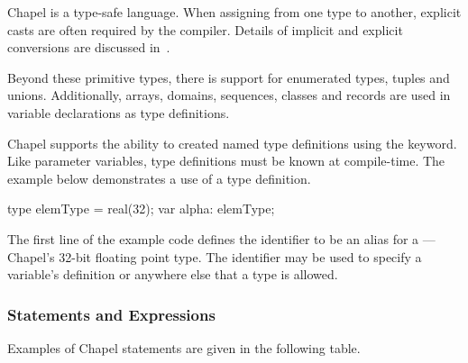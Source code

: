 Chapel is a type-safe language.  When assigning from one type to another, explicit 
casts are often required by the compiler.  Details of implicit and explicit
conversions are discussed in~.


Beyond these primitive types, there is support for enumerated types, tuples and
unions.  Additionally, arrays, domains, sequences, classes and records are
used in variable declarations as type definitions.

Chapel supports the ability to created named type definitions using
the  keyword.  Like parameter variables, type definitions
must be known at compile-time.  The example below demonstrates a use of a type
definition.

\begin{chapel}
type elemType = real(32);
var alpha: elemType;
\end{chapel}

The first line of the example code defines the identifier 
 to be
an alias for a ---Chapel's 32-bit floating point type.
The identifier  may be used to specify a variable's
definition or anywhere else that a type is allowed.  

\subsubsection{Statements and Expressions}
\label{Statements_and_Expressions}

Examples of Chapel statements are given in the following table.

